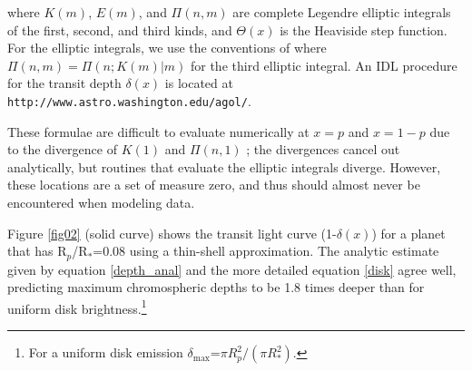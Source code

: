 \documentclass[twocolumn]{emulateapj}
\newcommand{\p}{R$_p$/R$_*$}
\begin{document}
where $K(m)$, $E(m)$, and $\Pi(n,m)$ are complete Legendre elliptic 
integrals of the first, second, and third kinds, and $\Theta(x)$ is
the Heaviside step function. For the elliptic integrals, we use the conventions of \citet{handbk} where $\Pi(n,m) = \Pi(n;K(m)|m)$ for the third elliptic integral. An IDL procedure for the transit depth $\delta (x)$ is located at \texttt{http://www.astro.washington.edu/agol/}.

These formulae are difficult to evaluate numerically at 
$x=p$ and $x=1-p$ due to the divergence of $K(1)$ and $\Pi(n,1)$
; the divergences cancel out analytically, but routines that
evaluate the elliptic integrals diverge.  However, these locations
are a set of measure zero, and thus should almost never be encountered
when modeling data. 


Figure \ref{fig02} (solid curve) shows the transit light curve (1-$\delta (x)$) for a planet that has \p =0.08 using a thin-shell approximation.  The analytic estimate given by equation \ref{depth_anal} and the more detailed equation \ref{disk} agree well, predicting maximum chromospheric depths to be 1.8 times
deeper than for uniform disk brightness.\footnote{For a uniform disk emission $\delta_{\mathrm{max}} $=$\pi R_p^2 /(\pi R_*^2)$.} 

\end{document}
